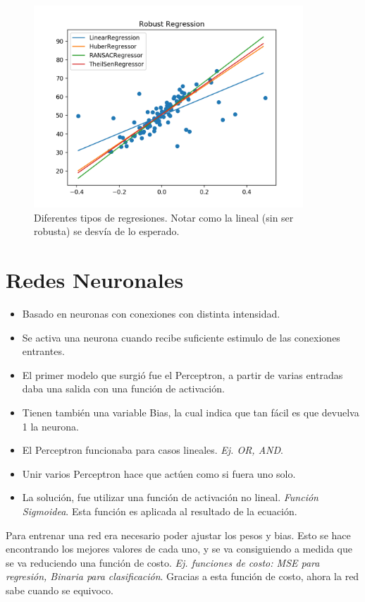 \documentclass[titlepage,a4paper]{article}
\begin{document}
\begin{figure}[!htb]
    \centering
    \includegraphics[width=0.9\textwidth]{imagenesResumen/ComparacionRegresiones.png}
    \caption{Diferentes tipos de regresiones. Notar como la lineal (sin ser robusta) se desvía de lo esperado.}
\end{figure}

\newpage

\section{Redes Neuronales}
\begin{itemize}
    \item Basado en neuronas con conexiones con distinta intensidad.
    \item Se activa una neurona cuando recibe suficiente estimulo de las conexiones entrantes.
    \item El primer modelo que surgió fue el Perceptron, a partir de varias entradas daba una salida con una función de activación.
    \item Tienen también una variable Bias, la cual indica que tan fácil es que devuelva 1 la neurona.
    \item El Perceptron funcionaba para casos lineales. \textit{Ej. OR, AND}. 
    \item Unir varios Perceptron hace que actúen como si fuera uno solo.
    \item La solución, fue utilizar una función de activación no lineal. \textit{Función Sigmoidea}. Esta función es aplicada al resultado de la ecuación.
\end{itemize}

Para entrenar una red era necesario poder ajustar los pesos y bias. Esto se hace encontrando los mejores valores de cada uno, y se va consiguiendo a medida que se va reduciendo una función de costo. \textit{Ej. funciones de costo: MSE para regresión, Binaria para clasificación}. Gracias a esta función de costo, ahora la red sabe cuando se equivoco. 
\end{document}
